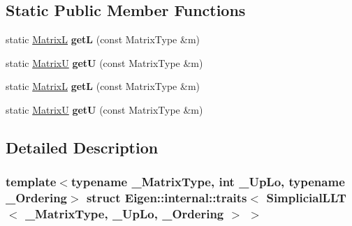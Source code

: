 \subsection*{Static Public Member Functions}
\begin{DoxyCompactItemize}
\item 
\mbox{\label{struct_eigen_1_1internal_1_1traits_3_01_simplicial_l_l_t_3_01___matrix_type_00_01___up_lo_00_01___ordering_01_4_01_4_a033298b6c58837a99b2ad57713254826}} 
static \hyperlink{group___core___module_class_eigen_1_1_triangular_view}{MatrixL} {\bfseries getL} (const Matrix\+Type \&m)
\item 
\mbox{\label{struct_eigen_1_1internal_1_1traits_3_01_simplicial_l_l_t_3_01___matrix_type_00_01___up_lo_00_01___ordering_01_4_01_4_a2df55ac6690830d6f90a080379c61f3c}} 
static \hyperlink{group___core___module_class_eigen_1_1_triangular_view}{MatrixU} {\bfseries getU} (const Matrix\+Type \&m)
\item 
\mbox{\label{struct_eigen_1_1internal_1_1traits_3_01_simplicial_l_l_t_3_01___matrix_type_00_01___up_lo_00_01___ordering_01_4_01_4_a033298b6c58837a99b2ad57713254826}} 
static \hyperlink{group___core___module_class_eigen_1_1_triangular_view}{MatrixL} {\bfseries getL} (const Matrix\+Type \&m)
\item 
\mbox{\label{struct_eigen_1_1internal_1_1traits_3_01_simplicial_l_l_t_3_01___matrix_type_00_01___up_lo_00_01___ordering_01_4_01_4_a2df55ac6690830d6f90a080379c61f3c}} 
static \hyperlink{group___core___module_class_eigen_1_1_triangular_view}{MatrixU} {\bfseries getU} (const Matrix\+Type \&m)
\end{DoxyCompactItemize}


\subsection{Detailed Description}
\subsubsection*{template$<$typename \+\_\+\+Matrix\+Type, int \+\_\+\+Up\+Lo, typename \+\_\+\+Ordering$>$\newline
struct Eigen\+::internal\+::traits$<$ Simplicial\+L\+L\+T$<$ \+\_\+\+Matrix\+Type, \+\_\+\+Up\+Lo, \+\_\+\+Ordering $>$ $>$}



